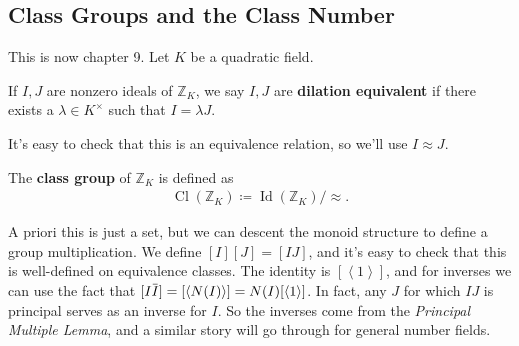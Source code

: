 \hypertarget{class-groups-and-the-class-number}{%
\subsection{Class Groups and the Class
Number}\label{class-groups-and-the-class-number}}

\begin{remark}

This is now chapter 9. Let \(K\) be a quadratic field.

\end{remark}

\begin{definition}

If \(I, J\) are nonzero ideals of \({\mathbb{Z}}_K\), we say \(I, J\)
are \textbf{dilation equivalent} if there exists a
\(\lambda\in K^{\times}\) such that \(I = \lambda J\).

\end{definition}

\begin{remark}

It's easy to check that this is an equivalence relation, so we'll use
\(I \approx J\).

\end{remark}

\begin{definition}

The \textbf{class group} of \({\mathbb{Z}}_K\) is defined as
\begin{align*}
\operatorname{Cl}({\mathbb{Z}}_K) \coloneqq\operatorname{Id}({\mathbb{Z}}_K)/\approx
.\end{align*}

\end{definition}

\begin{remark}

A priori this is just a set, but we can descent the monoid structure to
define a group multiplication. We define \([I] [J] = [IJ]\), and it's
easy to check that this is well-defined on equivalence classes. The
identity is \([ \left\langle{ 1 }\right\rangle]\), and for inverses we
can use the fact that
\([I \mkern 1.5mu\overline{\mkern-1.5muI\mkern-1.5mu}\mkern 1.5mu] = [\left\langle{ N(I) }\right\rangle] = N(I) [ \left\langle{ 1 }\right\rangle ]\).
In fact, any \(J\) for which \(IJ\) is principal serves as an inverse
for \(I\). So the inverses come from the \emph{Principal Multiple
Lemma}, and a similar story will go through for general number fields.

\end{remark}

